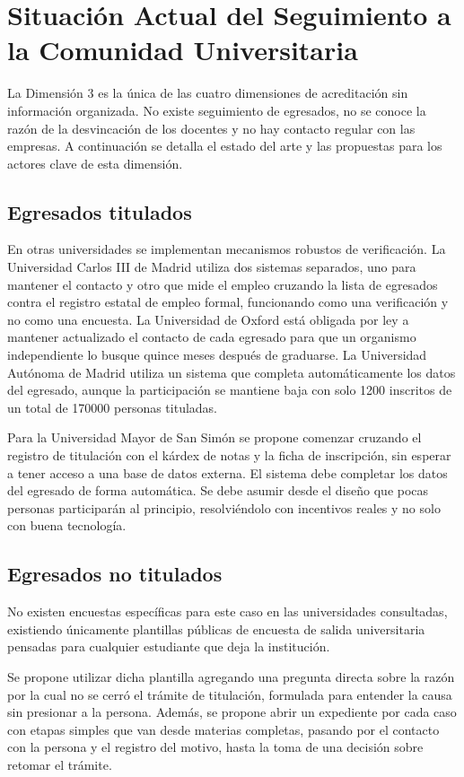 \documentclass{./plantilla/umss}
\begin{document}
\section{Situación Actual del Seguimiento a la Comunidad Universitaria}

La Dimensión 3 es la única de las cuatro dimensiones de acreditación sin información organizada. No existe seguimiento de egresados, no se conoce la razón de la desvincación de los docentes y no hay contacto regular con las empresas. A continuación se detalla el estado del arte y las propuestas para los actores clave de esta dimensión.

\subsection{Egresados titulados}
En otras universidades se implementan mecanismos robustos de verificación. La Universidad Carlos III de Madrid utiliza dos sistemas separados, uno para mantener el contacto y otro que mide el empleo cruzando la lista de egresados contra el registro estatal de empleo formal, funcionando como una verificación y no como una encuesta. La Universidad de Oxford está obligada por ley a mantener actualizado el contacto de cada egresado para que un organismo independiente lo busque quince meses después de graduarse. La Universidad Autónoma de Madrid utiliza un sistema que completa automáticamente los datos del egresado, aunque la participación se mantiene baja con solo 1200 inscritos de un total de 170000 personas tituladas.

Para la Universidad Mayor de San Simón se propone comenzar cruzando el registro de titulación con el kárdex de notas y la ficha de inscripción, sin esperar a tener acceso a una base de datos externa. El sistema debe completar los datos del egresado de forma automática. Se debe asumir desde el diseño que pocas personas participarán al principio, resolviéndolo con incentivos reales y no solo con buena tecnología.

\subsection{Egresados no titulados}
No existen encuestas específicas para este caso en las universidades consultadas, existiendo únicamente plantillas públicas de encuesta de salida universitaria pensadas para cualquier estudiante que deja la institución. 

Se propone utilizar dicha plantilla agregando una pregunta directa sobre la razón por la cual no se cerró el trámite de titulación, formulada para entender la causa sin presionar a la persona. Además, se propone abrir un expediente por cada caso con etapas simples que van desde materias completas, pasando por el contacto con la persona y el registro del motivo, hasta la toma de una decisión sobre retomar el trámite.
\end{document}
